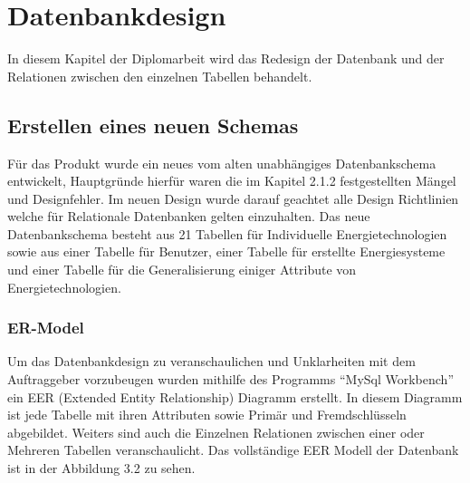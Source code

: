 \section{Datenbankdesign}
In diesem Kapitel der Diplomarbeit wird das Redesign der Datenbank und der Relationen zwischen den einzelnen Tabellen behandelt.


\subsection{Erstellen eines neuen Schemas}
Für das Produkt wurde ein neues vom alten unabhängiges Datenbankschema entwickelt, Hauptgründe hierfür waren die im Kapitel 2.1.2 festgestellten Mängel und Designfehler. Im neuen Design wurde darauf geachtet alle Design Richtlinien welche für Relationale Datenbanken gelten einzuhalten. Das neue Datenbankschema besteht aus 21 Tabellen für Individuelle Energietechnologien sowie aus einer Tabelle für Benutzer, einer Tabelle für erstellte Energiesysteme und einer Tabelle für die Generalisierung einiger Attribute von Energietechnologien.

\subsubsection{ER-Model}
Um das Datenbankdesign zu veranschaulichen und Unklarheiten mit dem Auftraggeber vorzubeugen wurden mithilfe des Programms “MySql Workbench” ein EER (Extended Entity Relationship) Diagramm erstellt. In diesem Diagramm ist jede Tabelle mit ihren Attributen sowie Primär und Fremdschlüsseln abgebildet. Weiters sind auch die Einzelnen Relationen zwischen einer oder Mehreren Tabellen veranschaulicht. Das vollständige EER Modell der Datenbank ist in der Abbildung 3.2 zu sehen.

